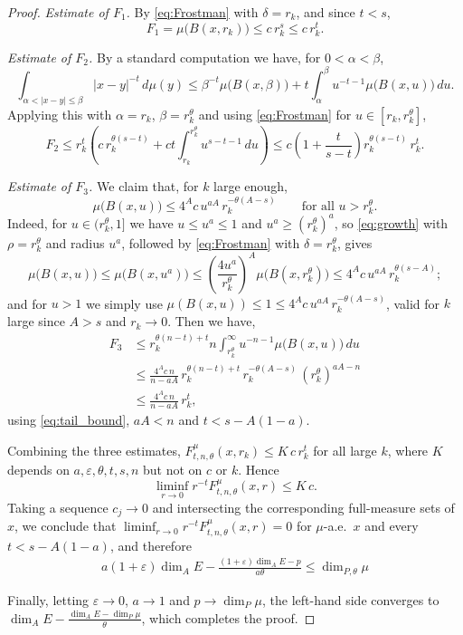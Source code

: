 \documentclass[12pt]{amsart}
\theoremstyle{definition}
\theoremstyle{remark}
\numberwithin{equation}{section}
\begin{document}
\begin{proof}
\emph{Estimate of $F_1$.} By \eqref{eq:Frostman} with $\delta=r_k$, and
since $t<s$,
$$F_1=\mu\bigl(B(x,r_k)\bigr)\leq c\,r_k^{s}\leq c\,r_k^{t}.$$

\emph{Estimate of $F_2$.} By a standard computation we have,
for $0<\alpha<\beta$,
$$\int_{\alpha<|x-y|\leq\beta}|x-y|^{-t}\,d\mu(y)
\leq \beta^{-t}\mu\bigl(B(x,\beta)\bigr)
+t\int_{\alpha}^{\beta}u^{-t-1}\mu\bigl(B(x,u)\bigr)\,du.$$
Applying this with $\alpha=r_k$, $\beta=r_k^{\theta}$ and using
\eqref{eq:Frostman} for $u\in[r_k,r_k^{\theta}]$,
$$F_2\leq r_k^{t}\left(c\,r_k^{\theta(s-t)}
+ct\int_{r_k}^{r_k^{\theta}}u^{s-t-1}\,du\right)
\leq c\left(1+\frac{t}{s-t}\right)r_k^{\theta(s-t)}\,r_k^{t}.$$

\emph{Estimate of $F_3$.} We claim that, for $k$ large enough,
\begin{equation}\label{eq:tail_bound}
\mu\bigl(B(x,u)\bigr)\leq 4^{A}c\,u^{aA}\,r_k^{-\theta(A-s)}
\qquad\text{for all }u>r_k^{\theta}.
\end{equation}
Indeed, for $u\in(r_k^{\theta},1]$ we have $u\leq u^{a}\leq 1$ and
$u^{a}\geq(r_k^{\theta})^{a}$, so \eqref{eq:growth} with $\rho=r_k^{\theta}$
and radius $u^{a}$, followed by \eqref{eq:Frostman} with
$\delta=r_k^{\theta}$, gives
$$\mu\bigl(B(x,u)\bigr)\leq\mu\bigl(B(x,u^{a})\bigr)
\leq\left(\frac{4u^{a}}{r_k^{\theta}}\right)^{A}
\mu\bigl(B(x,r_k^{\theta})\bigr)
\leq 4^{A}c\,u^{aA}\,r_k^{\theta(s-A)};$$
and for $u>1$ we simply use $\mu(B(x,u))\leq 1\leq 4^{A}c\,u^{aA}\,
r_k^{-\theta(A-s)}$, valid for $k$ large since $A>s$ and $r_k\to 0$.
Then we have,
\begin{align*}
    F_3&\leq r_k^{\theta(n-t)+t} n\int_{r_k^{\theta}}^{\infty}
u^{-n-1}\mu\bigl(B(x,u)\bigr)\,du\\
&\leq \frac{4^{A}c\,n}{n-aA}\,r_k^{\theta(n-t)+t}\,
r_k^{-\theta(A-s)}\,(r_k^{\theta})^{aA-n}\\
&\leq \frac{4^{A}c\,n}{n-aA}\,r_k^{t},
\end{align*}
using \eqref{eq:tail_bound}, $aA<n$ and $t<s-A(1-a)$.

Combining the three estimates,
$F_{t,n,\theta}^{\mu}(x,r_k)\leq K\,c\,r_k^{t}$ for all large $k$, where
$K$ depends on $a,\varepsilon,\theta,t,s,n$ but not on $c$ or $k$. Hence
$$\liminf_{r\to 0}r^{-t}F_{t,n,\theta}^{\mu}(x,r)\leq K\,c.$$
Taking a sequence $c_j\to 0$ and intersecting the corresponding
full-measure sets of $x$, we conclude that
$\liminf_{r\to 0}r^{-t}F_{t,n,\theta}^{\mu}(x,r)=0$ for $\mu$-a.e.\ $x$
and every $t<s-A(1-a)$, and therefore
\begin{align*}
 a(1+\varepsilon)\dim_A E-\frac{(1+\varepsilon)\dim_A E-p}{a\theta}
\leq \dim_{P,\theta}\mu\end{align*}


Finally, letting $\varepsilon\to 0$, $a\to 1$ and $p\to\dim_P\mu$, the left-hand side
converges to $\dim_A E-\frac{\dim_A E-\dim_P\mu}{\theta}$, which
completes the proof.
\end{proof}
\end{document}
